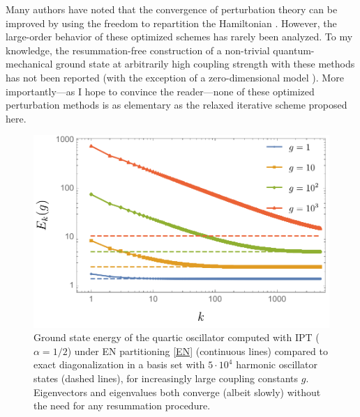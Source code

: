\documentclass[aps,prl,reprint]{revtex4-2}
\begin{document}
	Many authors have noted that the convergence of perturbation theory can be improved by using the freedom to repartition the Hamiltonian \cite{HirschfelderIterationVariationProcedures1963,caswell1979accurate, seznec1979summation, schwartz1992nonlinear, shirokov1995superconvergent, SchererSuperconvergentPerturbationMethod1995, SzabadosOptimizedpartitioningRayleigh1999}. However, the large-order behavior of these optimized schemes has rarely been analyzed. To my knowledge, the resummation-free construction of a non-trivial quantum-mechanical ground state at arbitrarily high coupling strength with these methods has not been reported (with the exception of a zero-dimensional model \cite{remez2018divergent}). More importantly---as I hope to convince the reader---none of these optimized perturbation methods is as elementary as the relaxed iterative scheme proposed here.

	       \begin{figure}[t!]
	\hspace*{-1.1cm}
	\includegraphics[width = \columnwidth]{quartic.pdf}
	\caption{Ground state energy of the quartic oscillator computed with IPT ($\alpha = 1/2$) under EN partitioning \eqref{EN} (continuous lines) compared to exact diagonalization in a basis set with $5\cdot 10^4$ harmonic oscillator states (dashed lines), for increasingly large coupling constants $g$. Eigenvectors and eigenvalues both converge (albeit slowly) without the need for any resummation procedure.
	}
	\label{fig:quartic}
	\end{figure}
\end{document}
